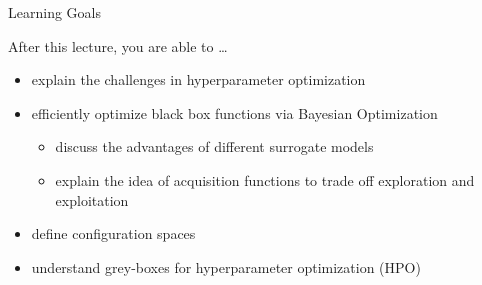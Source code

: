 \begin{frame}[c]{Learning Goals}

After this lecture, you are able to \ldots

\begin{itemize}
	\item explain the \alert{challenges in hyperparameter optimization}
	\item efficiently optimize black box functions via \alert{Bayesian Optimization}
	\begin{itemize}
		\item discuss the advantages of different \alert{surrogate models}
		\item explain the idea of \alert{acquisition functions} to trade off exploration and exploitation
	\end{itemize}
	\item define \alert{configuration spaces}
	\item understand \alert{grey-boxes} for hyperparameter optimization (HPO)
\end{itemize}
\end{frame}
